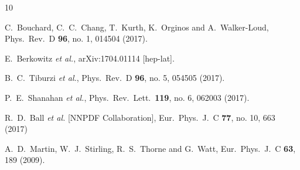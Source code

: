 \begin{thebibliography}{10}
  
  

  
  
  C.~Bouchard, C.~C.~Chang, T.~Kurth, K.~Orginos and A.~Walker-Loud,
  Phys.\ Rev.\ D {\bf 96}, no. 1, 014504 (2017).
  
  
  E.~Berkowitz {\it et al.},
  arXiv:1704.01114 [hep-lat].
  

  
  B.~C.~Tiburzi {\it et al.},
  Phys.\ Rev.\ D {\bf 96}, no. 5, 054505 (2017).
  
  

  
  P.~E.~Shanahan {\it et al.},
  Phys.\ Rev.\ Lett.\  {\bf 119}, no. 6, 062003 (2017).
  
  
  R.~D.~Ball {\it et al.} [NNPDF Collaboration],
  Eur.\ Phys.\ J.\ C {\bf 77}, no. 10, 663 (2017)
 

  
 
  A.~D.~Martin, W.~J.~Stirling, R.~S.~Thorne and G.~Watt,
  Eur.\ Phys.\ J.\ C {\bf 63}, 189 (2009).
  

\end{thebibliography}
